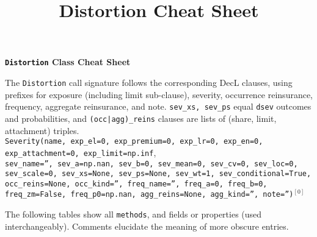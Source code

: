 \documentclass{article}
\title{Distortion Cheat Sheet}
\begin{document}
{\huge{\textbf{\texttt{Distortion} Class Cheat Sheet}}}

\raggedright The \texttt{Distortion} call signature follows the corresponding DecL clauses, using prefixes for exposure (including limit sub-clause), severity, occurrence reinsurance, frequency, aggregate reinsurance, and note. \texttt{sev\_xs, sev\_ps} equal \texttt{dsev} outcomes and probabilities, and \texttt{(occ|agg)\_reins} clauses are lists of (share, limit, attachment) triples. \\
 \texttt{\m Severity(name, exp\_el=0, exp\_premium=0, exp\_lr=0, exp\_en=0, exp\_attachment=0, exp\_limit=np.inf}, \\
 \texttt{\phantom{\m}sev\_name='', sev\_a=np.nan, sev\_b=0, sev\_mean=0, sev\_cv=0, sev\_loc=0, sev\_scale=0, sev\_xs=None, sev\_ps=None, sev\_wt=1, sev\_conditional=True, }\\
 \texttt{\phantom{\m}occ\_reins=None, occ\_kind='', freq\_name='', freq\_a=0, freq\_b=0, freq\_zm=False, freq\_p0=np.nan, agg\_reins=None, agg\_kind='', note='')}${}^{[0]}$

The following tables show all \texttt{\m methods}, and fields or properties (used interchangeably). Comments elucidate the meaning of more obscure entries.
\end{document}
